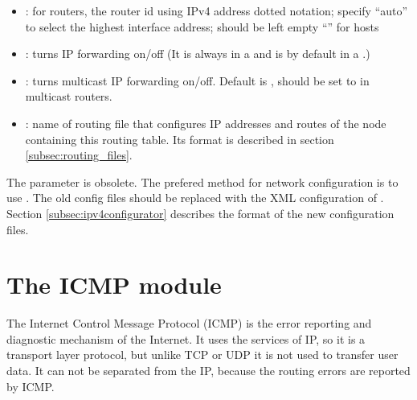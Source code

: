 \begin{itemize}
  \item {}: for routers, the router id using IPv4 address dotted notation;
        specify ``auto'' to select the highest interface address; should be left empty ``''
        for hosts
  \item {}: turns IP forwarding on/off (It is always 
                          in a  and is  by default
                          in a .)
  \item {}: turns multicast IP forwarding on/off. Default is ,
  should be set to  in multicast routers. 
  \item {}: name of routing file that configures IP addresses and routes of the node
  containing this routing table. Its format is described in section \ref{subsec:routing_files}.
\end{itemize}

\begin{warning}
The  parameter is obsolete. The prefered method for network configuration
is to use . The old config files should be replaced
with the XML configuration of . Section \ref{subsec:ipv4configurator}
describes the format of the new configuration files.
\end{warning}


\section{The ICMP module}

The Internet Control Message Protocol (ICMP) is the error reporting and
diagnostic mechanism of the Internet.
It uses the services of IP, so it is a transport layer protocol, but unlike
TCP or UDP it is not used to transfer user data. It can not be separated
from the IP, because the routing errors are reported by ICMP.

